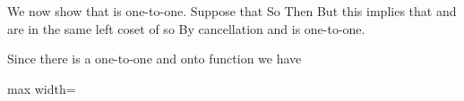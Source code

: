 \documentclass[11pt,oneside]{article}
\begin{document}
\begin{BookBody}
We now show that  is one-to-one. Suppose that  So  Then  But this implies that  and  are in the same left coset of  so  By cancellation and  is one-to-one.

Since there is a one-to-one and onto function  we have

\begin{center}\begin{adjustbox}{max width=\linewidth}\end{adjustbox}\end{center} \BookEnd{\blacklozenge}

\end{BookBody}

\BookNarrativetrue
\end{document}
